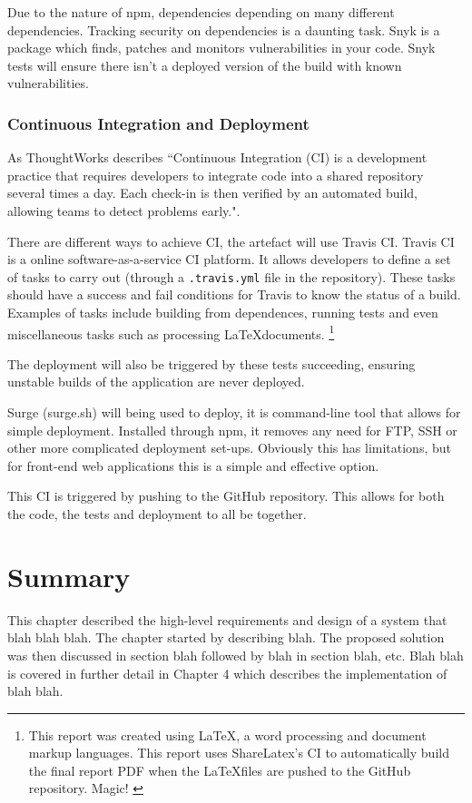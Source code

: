 Due to the nature of npm, dependencies depending on many different dependencies. Tracking security on dependencies is a daunting task. Snyk is a package which finds, patches and monitors vulnerabilities in your code. \cite{snyk} Snyk tests will ensure there isn't a deployed version of the build with known vulnerabilities.

\subsubsection{Continuous Integration and Deployment} \label{a-d--continuous-integration}

As ThoughtWorks describes ``Continuous Integration (CI) is a development practice that requires developers to integrate code into a shared repository several times a day. Each check-in is then verified by an automated build, allowing teams to detect problems early.". \cite{continuous_integration}

There are different ways to achieve CI, the artefact will use Travis CI. Travis CI is a online software-as-a-service CI platform. It allows developers to define a set of tasks to carry out (through a \verb|.travis.yml| file in the repository). These tasks should have a success and fail conditions for Travis to know the status of a build. Examples of tasks include building from dependences, running tests and even miscellaneous tasks such as processing \LaTeX documents. \footnote{This report was created using \LaTeX, a word processing and document markup languages. \cite{latex} This report uses ShareLatex's CI to automatically build the final report PDF when the \LaTeX files are pushed to the GitHub repository. Magic! \cite{sharelatex}}

The deployment will also be triggered by these tests succeeding, ensuring unstable builds of the application are never deployed.

Surge (surge.sh) will being used to deploy, it is command-line tool that allows for simple deployment. Installed through npm, it removes any need for FTP, SSH or other more complicated deployment set-ups. Obviously this has limitations, but for front-end web applications this is a simple and effective option. \cite{surge}

This CI is triggered by pushing to the GitHub repository. This allows for both the code, the tests and deployment to all be together.

\section{Summary} \label{a-d--summary}

This chapter described the high-level requirements and design of a system that blah blah blah.  The chapter started by describing blah.  The proposed solution was then discussed in section blah followed by blah in section blah, etc.
Blah blah is covered in further detail in Chapter 4 which describes the implementation of blah blah.
